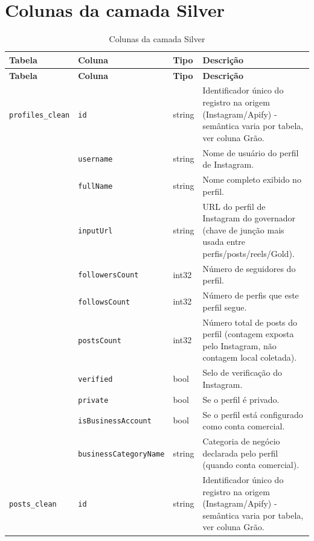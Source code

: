 \section*{Colunas da camada Silver}
\begin{footnotesize}
\begin{longtable}{p{3.2cm}p{3.0cm}p{2.0cm}p{6.0cm}}
\caption{Colunas da camada Silver}\\
\toprule \textbf{Tabela} & \textbf{Coluna} & \textbf{Tipo} & \textbf{Descrição} \\ \midrule \endfirsthead
\toprule \textbf{Tabela} & \textbf{Coluna} & \textbf{Tipo} & \textbf{Descrição} \\ \midrule \endhead
\bottomrule \endfoot
\texttt{profiles\_\allowbreak{}clean} & \texttt{id} & string & Identificador único do registro na origem (Instagram/\allowbreak{}Apify) - semântica varia por tabela, ver coluna Grão. \\
\texttt{} & \texttt{username} & string & Nome de usuário do perfil de Instagram. \\
\texttt{} & \texttt{fullName} & string & Nome completo exibido no perfil. \\
\texttt{} & \texttt{inputUrl} & string & URL do perfil de Instagram do governador (chave de junção mais usada entre perfis/\allowbreak{}posts/\allowbreak{}reels/\allowbreak{}Gold). \\
\texttt{} & \texttt{followersCount} & int32 & Número de seguidores do perfil. \\
\texttt{} & \texttt{followsCount} & int32 & Número de perfis que este perfil segue. \\
\texttt{} & \texttt{postsCount} & int32 & Número total de posts do perfil (contagem exposta pelo Instagram, não contagem local coletada). \\
\texttt{} & \texttt{verified} & bool & Selo de verificação do Instagram. \\
\texttt{} & \texttt{private} & bool & Se o perfil é privado. \\
\texttt{} & \texttt{isBusinessAccount} & bool & Se o perfil está configurado como conta comercial. \\
\texttt{} & \texttt{businessCategoryName} & string & Categoria de negócio declarada pelo perfil (quando conta comercial). \\
\texttt{posts\_\allowbreak{}clean} & \texttt{id} & string & Identificador único do registro na origem (Instagram/\allowbreak{}Apify) - semântica varia por tabela, ver coluna Grão. \\

\end{longtable}
\end{footnotesize}
